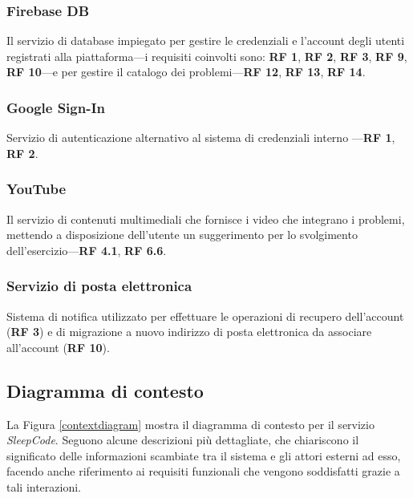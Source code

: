 \documentclass[11pt, a4paper]{article}
\theoremstyle{definition} %
\begin{document}
\subsubsection{Firebase DB}
Il servizio di database impiegato per gestire le credenziali e l'account
degli utenti registrati alla piattaforma—i requisiti coinvolti sono: \textbf{RF 1},
\textbf{RF 2}, \textbf{RF 3}, \textbf{RF 9}, \textbf{RF 10}—e per gestire il
catalogo dei problemi—\textbf{RF 12}, \textbf{RF 13}, \textbf{RF 14}.

\subsubsection{Google Sign-In}
Servizio di autenticazione alternativo al sistema di credenziali interno
—\textbf{RF 1}, \textbf{RF 2}.

\subsubsection{YouTube}
Il servizio di contenuti multimediali che fornisce i video che integrano
i problemi, mettendo a disposizione dell'utente un suggerimento per lo
svolgimento dell'esercizio—\textbf{RF 4.1}, \textbf{RF 6.6}.

\subsubsection{Servizio di posta elettronica}
Sistema di notifica utilizzato per effettuare le operazioni di recupero
dell'account (\textbf{RF 3}) e di migrazione a nuovo indirizzo di posta
elettronica da associare all'account (\textbf{RF 10}).

\newpage
\subsection{Diagramma di contesto} %
La Figura \ref{contextdiagram} mostra il diagramma di contesto per il
servizio \textit{SleepCode}. Seguono alcune descrizioni più dettagliate,
che chiariscono il significato delle informazioni scambiate tra il sistema
e gli attori esterni ad esso, facendo anche riferimento ai requisiti
funzionali che vengono soddisfatti grazie a tali interazioni.
\end{document}
